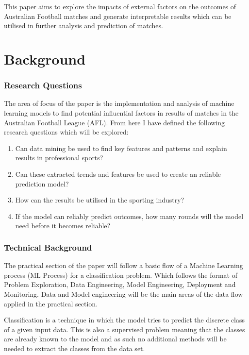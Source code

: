 \documentclass{imc-inf}
\begin{document}
	This paper aims to explore the impacts of external factors on the outcomes of Australian Football matches and generate interpretable results which can be utilised in further analysis and prediction of matches.
	
	
	\chapter{Background}\label{chap:background}
	\subsection{Research Questions}
	
	The area of focus of the paper is the implementation and analysis of machine learning models to find potential influential factors in results of matches in the Australian Football League (AFL).
	From here I have defined the following research questions which will be explored:
	\begin{enumerate}
		
		\item[] Can data mining be used to find key features and patterns and explain results in professional sports?
		
		\item[]Can these extracted trends and features be used to create an reliable prediction model?
		
		\item[] How can the results be utilised in the sporting industry?
		
		\item[] If the model can reliably predict outcomes, how many rounds will the model need before it becomes reliable?
	\end{enumerate}
	
	
	\subsection{Technical Background}
	The practical section of the paper will follow a basic flow of a Machine Learning process (ML Process) for a classification problem. Which follows the format of Problem Exploration, Data Engineering, Model Engineering, Deployment and Monitoring. Data and Model engineering will be the main areas of the data flow applied in the practical section.
	
	Classification is a technique in which the model tries to predict the discrete class of a given input data. This is also a supervised problem meaning that the classes are already known to the model and as such no additional methods will be needed to extract the classes from the data set.
	\newline
	
\end{document}
